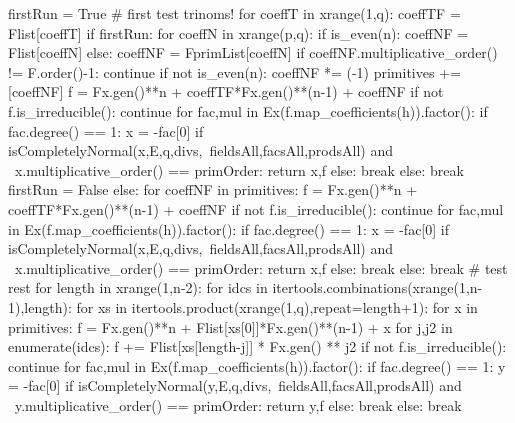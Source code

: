 \begin{sagecode}[caption={Aus \url{../Sage/findAnyPCN_trinom.spyx}},
  label=lst:findAnyPCN_polynom]
    firstRun = True
    # first test trinoms!
    for coeffT in xrange(1,q):
        coeffTF = Flist[coeffT]
        if firstRun:
            for coeffN in xrange(p,q):
                if is_even(n):
                    coeffNF = Flist[coeffN]
                else:
                    coeffNF = FprimList[coeffN]
                if coeffNF.multiplicative_order() != F.order()-1: continue
                if not is_even(n): coeffNF *= (-1)
                primitives += [coeffNF]
                f = Fx.gen()**n + coeffTF*Fx.gen()**(n-1) + coeffNF
                if not f.is_irreducible(): continue
                for fac,mul in Ex(f.map_coefficients(h)).factor():
                    if fac.degree() == 1:
                        x = -fac[0]
                        if isCompletelyNormal(x,E,q,divs,\
                                    fieldsAll,facsAll,prodsAll) and \
                                x.multiplicative_order() == primOrder:
                            return x,f
                        else: break
                    else: break
            firstRun = False
        else:
            for coeffNF in primitives:
                f = Fx.gen()**n + coeffTF*Fx.gen()**(n-1) + coeffNF
                if not f.is_irreducible(): continue
                for fac,mul in Ex(f.map_coefficients(h)).factor():
                    if fac.degree() == 1:
                        x = -fac[0]
                        if isCompletelyNormal(x,E,q,divs,\
                                    fieldsAll,facsAll,prodsAll) and \
                                x.multiplicative_order() == primOrder:
                            return x,f
                        else: break
                    else: break
    # test rest
    for length in xrange(1,n-2):
        for idcs in itertools.combinations(xrange(1,n-1),length):
            for xs in itertools.product(xrange(1,q),repeat=length+1):
                for x in primitives:
                    f = Fx.gen()**n + Flist[xs[0]]*Fx.gen()**(n-1) + x
                    for j,j2 in enumerate(idcs):
                        f += Flist[xs[length-j]] * Fx.gen() ** j2
                    if not f.is_irreducible(): continue
                    for fac,mul in Ex(f.map_coefficients(h)).factor():
                        if fac.degree() == 1:
                            y = -fac[0]
                            if isCompletelyNormal(y,E,q,divs,\
                                    fieldsAll,facsAll,prodsAll) and \
                                    y.multiplicative_order() == primOrder:
                                return y,f
                            else: break
                        else: break
\end{sagecode}

